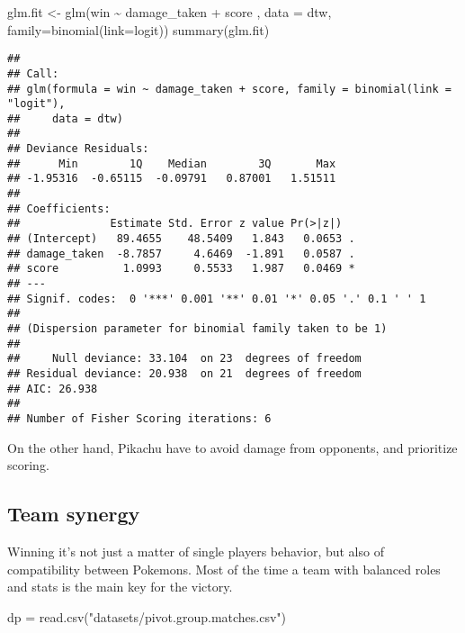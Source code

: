 \documentclass[
]{article}
\newenvironment{Shaded}{\begin{snugshade}}{\end{snugshade}}
\newcommand{\AttributeTok}[1]{\textcolor[rgb]{0.77,0.63,0.00}{#1}}
\newcommand{\FunctionTok}[1]{\textcolor[rgb]{0.00,0.00,0.00}{#1}}
\newcommand{\NormalTok}[1]{#1}
\newcommand{\OtherTok}[1]{\textcolor[rgb]{0.56,0.35,0.01}{#1}}
\newcommand{\SpecialCharTok}[1]{\textcolor[rgb]{0.00,0.00,0.00}{#1}}
\newcommand{\StringTok}[1]{\textcolor[rgb]{0.31,0.60,0.02}{#1}}
\begin{document}
\begin{Shaded}
\begin{Highlighting}[]
\NormalTok{glm.fit }\OtherTok{\textless{}{-}} \FunctionTok{glm}\NormalTok{(win }\SpecialCharTok{\textasciitilde{}}\NormalTok{ damage\_taken }\SpecialCharTok{+}\NormalTok{ score , }\AttributeTok{data =}\NormalTok{ dtw, }\AttributeTok{family=}\FunctionTok{binomial}\NormalTok{(}\AttributeTok{link=}\StringTok{\textquotesingle{}logit\textquotesingle{}}\NormalTok{))}
\FunctionTok{summary}\NormalTok{(glm.fit)}
\end{Highlighting}
\end{Shaded}

\begin{verbatim}
## 
## Call:
## glm(formula = win ~ damage_taken + score, family = binomial(link = "logit"), 
##     data = dtw)
## 
## Deviance Residuals: 
##      Min        1Q    Median        3Q       Max  
## -1.95316  -0.65115  -0.09791   0.87001   1.51511  
## 
## Coefficients:
##              Estimate Std. Error z value Pr(>|z|)  
## (Intercept)   89.4655    48.5409   1.843   0.0653 .
## damage_taken  -8.7857     4.6469  -1.891   0.0587 .
## score          1.0993     0.5533   1.987   0.0469 *
## ---
## Signif. codes:  0 '***' 0.001 '**' 0.01 '*' 0.05 '.' 0.1 ' ' 1
## 
## (Dispersion parameter for binomial family taken to be 1)
## 
##     Null deviance: 33.104  on 23  degrees of freedom
## Residual deviance: 20.938  on 21  degrees of freedom
## AIC: 26.938
## 
## Number of Fisher Scoring iterations: 6
\end{verbatim}

On the other hand, Pikachu have to avoid damage from opponents, and
prioritize scoring.

\hypertarget{team-synergy}{%
\subsection{Team synergy}\label{team-synergy}}

Winning it's not just a matter of single players behavior, but also of
compatibility between Pokemons. Most of the time a team with balanced
roles and stats is the main key for the victory.

\begin{Shaded}
\begin{Highlighting}[]
\NormalTok{dp }\OtherTok{=} \FunctionTok{read.csv}\NormalTok{(}\StringTok{"datasets/pivot.group.matches.csv"}\NormalTok{)}
\end{Highlighting}
\end{Shaded}
\end{document}
